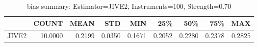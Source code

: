 \begin{table}[ht]
\centering
\caption{bias summary: Estimator=JIVE2, Instruments=100, Strength=0.70}
\begin{tabular}{lrrrrrrrr}
\toprule
 & COUNT & MEAN & STD & MIN & 25\% & 50\% & 75\% & MAX \\
\midrule
JIVE2 & 10.0000 & 0.2199 & 0.0350 & 0.1671 & 0.2052 & 0.2280 & 0.2378 & 0.2825 \\
\bottomrule
\end{tabular}
\end{table}
